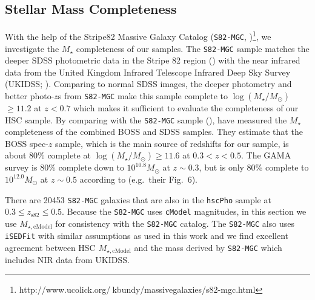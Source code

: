 \documentclass[a4paper,fleqn,usenatbib]{mnras}
\def\msun{$M_\odot$}
\def\etal{{\ et al.~}}
\def\ser{{S\'{e}rsic\ }}
\def\cmodel{\texttt{cModel}}
\def\mstar{{$M_{\star}$}}
\def\logms{{$\log (M_{\star}/M_{\odot})$}}
\def\mcmodel{{$M_{\star,\mathrm{cModel}}$}}
\begin{document}
        
   

\subsection{Stellar Mass Completeness}
    \label{ssec:complete}
    
    With the help of the Stripe82 Massive Galaxy Catalog (\texttt{S82-MGC},
    \citealt{Bundy2015}
    )\footnote{http://www.ucolick.org/$~$kbundy/massivegalaxies/s82-mgc.html}, 
    we investigate the \mstar{} completeness of our samples. 
    The \texttt{S82-MGC} sample matches the deeper SDSS photometric data in the 
    Stripe 82 region (\citealt{Annis2014}) with the near infrared data from the United 
    Kingdom Infrared Telescope Infrared Deep Sky Survey (UKIDSS; 
    \citealt{Lawrence2007}). 
    Comparing to normal SDSS images, the deeper photometry and better photo-$z$s 
    from \texttt{S82-MGC} make this sample complete to \logms{}$\geq 11.2$ at $z<0.7$ 
    which makes it sufficient to evaluate the completeness of our HSC sample.   
	By comparing with the \texttt{S82-MGC} sample (\citealt{Bundy2015}), 
	\citet{Leauthaud2016} have measured the \mstar{} completeness of the combined BOSS 
	and SDSS samples. 
    They estimate that the BOSS spec-$z$ sample, which is the main source of redshifts 
    for our sample, is about 80\% complete at 
    \logms{}$\geq 11.6$ at $0.3 < z < 0.5$. The GAMA survey is 80\% complete down to 
    $10^{10.8}$\msun{} at $z{\sim} 0.3$, but is only 80\% complete to 
    $10^{12.0}$\msun{} at $z{\sim} 0.5$ according to \citet{Taylor2011} (e.g.\ 
    their Fig.~6).
    
    There are 20453 \texttt{S82-MGC} galaxies that are also in the \texttt{hscPho} 
    sample at $0.3 \leq z_{\mathrm{s82}} \leq 0.5$.  
    Because the \texttt{S82-MGC} uses \cmodel{} magnitudes, in this section we use  
    \mcmodel{} for consistency with the \texttt{S82-MGC} catalog.  
    The \texttt{S82-MGC} also uses \texttt{iSEDFit} with similar assumptions as 
    used in this work and we find excellent agreement between HSC \mcmodel{} and 
    the mass derived by \texttt{S82-MGC} which includes NIR data from UKIDSS.
    
\end{document}
